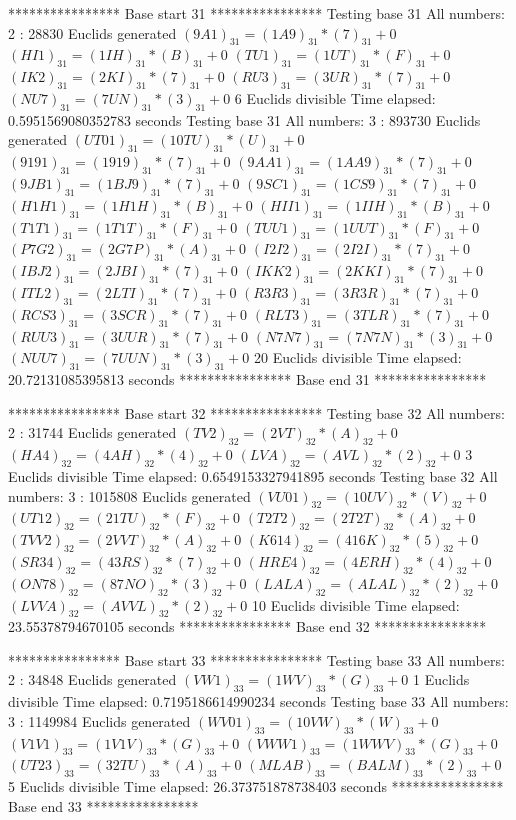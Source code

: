 **************** Base start 31 ****************
Testing base 31 All numbers: 2 :
	 28830 Euclids generated
	$(9A1)_{31}=(1A9)_{31}*(7)_{31}+0$
	$(HI1)_{31}=(1IH)_{31}*(B)_{31}+0$
	$(TU1)_{31}=(1UT)_{31}*(F)_{31}+0$
	$(IK2)_{31}=(2KI)_{31}*(7)_{31}+0$
	$(RU3)_{31}=(3UR)_{31}*(7)_{31}+0$
	$(NU7)_{31}=(7UN)_{31}*(3)_{31}+0$
	 6 Euclids divisible
Time elapsed: 0.5951569080352783 seconds
Testing base 31 All numbers: 3 :
	 893730 Euclids generated
	$(UT01)_{31}=(10TU)_{31}*(U)_{31}+0$
	$(9191)_{31}=(1919)_{31}*(7)_{31}+0$
	$(9AA1)_{31}=(1AA9)_{31}*(7)_{31}+0$
	$(9JB1)_{31}=(1BJ9)_{31}*(7)_{31}+0$
	$(9SC1)_{31}=(1CS9)_{31}*(7)_{31}+0$
	$(H1H1)_{31}=(1H1H)_{31}*(B)_{31}+0$
	$(HII1)_{31}=(1IIH)_{31}*(B)_{31}+0$
	$(T1T1)_{31}=(1T1T)_{31}*(F)_{31}+0$
	$(TUU1)_{31}=(1UUT)_{31}*(F)_{31}+0$
	$(P7G2)_{31}=(2G7P)_{31}*(A)_{31}+0$
	$(I2I2)_{31}=(2I2I)_{31}*(7)_{31}+0$
	$(IBJ2)_{31}=(2JBI)_{31}*(7)_{31}+0$
	$(IKK2)_{31}=(2KKI)_{31}*(7)_{31}+0$
	$(ITL2)_{31}=(2LTI)_{31}*(7)_{31}+0$
	$(R3R3)_{31}=(3R3R)_{31}*(7)_{31}+0$
	$(RCS3)_{31}=(3SCR)_{31}*(7)_{31}+0$
	$(RLT3)_{31}=(3TLR)_{31}*(7)_{31}+0$
	$(RUU3)_{31}=(3UUR)_{31}*(7)_{31}+0$
	$(N7N7)_{31}=(7N7N)_{31}*(3)_{31}+0$
	$(NUU7)_{31}=(7UUN)_{31}*(3)_{31}+0$
	 20 Euclids divisible
Time elapsed: 20.72131085395813 seconds
**************** Base end 31 ****************

**************** Base start 32 ****************
Testing base 32 All numbers: 2 :
	 31744 Euclids generated
	$(TV2)_{32}=(2VT)_{32}*(A)_{32}+0$
	$(HA4)_{32}=(4AH)_{32}*(4)_{32}+0$
	$(LVA)_{32}=(AVL)_{32}*(2)_{32}+0$
	 3 Euclids divisible
Time elapsed: 0.6549153327941895 seconds
Testing base 32 All numbers: 3 :
	 1015808 Euclids generated
	$(VU01)_{32}=(10UV)_{32}*(V)_{32}+0$
	$(UT12)_{32}=(21TU)_{32}*(F)_{32}+0$
	$(T2T2)_{32}=(2T2T)_{32}*(A)_{32}+0$
	$(TVV2)_{32}=(2VVT)_{32}*(A)_{32}+0$
	$(K614)_{32}=(416K)_{32}*(5)_{32}+0$
	$(SR34)_{32}=(43RS)_{32}*(7)_{32}+0$
	$(HRE4)_{32}=(4ERH)_{32}*(4)_{32}+0$
	$(ON78)_{32}=(87NO)_{32}*(3)_{32}+0$
	$(LALA)_{32}=(ALAL)_{32}*(2)_{32}+0$
	$(LVVA)_{32}=(AVVL)_{32}*(2)_{32}+0$
	 10 Euclids divisible
Time elapsed: 23.55378794670105 seconds
**************** Base end 32 ****************

**************** Base start 33 ****************
Testing base 33 All numbers: 2 :
	 34848 Euclids generated
	$(VW1)_{33}=(1WV)_{33}*(G)_{33}+0$
	 1 Euclids divisible
Time elapsed: 0.7195186614990234 seconds
Testing base 33 All numbers: 3 :
	 1149984 Euclids generated
	$(WV01)_{33}=(10VW)_{33}*(W)_{33}+0$
	$(V1V1)_{33}=(1V1V)_{33}*(G)_{33}+0$
	$(VWW1)_{33}=(1WWV)_{33}*(G)_{33}+0$
	$(UT23)_{33}=(32TU)_{33}*(A)_{33}+0$
	$(MLAB)_{33}=(BALM)_{33}*(2)_{33}+0$
	 5 Euclids divisible
Time elapsed: 26.373751878738403 seconds
**************** Base end 33 ****************

